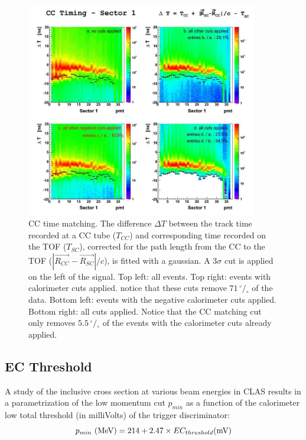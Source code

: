 \begin{figure}[h]
  \centering
		\includegraphics[width=0.90\textwidth]{img/cc_timing_sect1.jpg}
		\caption{CC time matching. The difference $\Delta T$ between the track time recorded
               at a CC tube ($T_{CC}$) and corresponding time recorded on the TOF ($T_{SC}$),
               corrected for the path length from the CC to the TOF ($|\vec{R_{CC}}-\vec{R_{SC}}|/c$),
               is fitted with a gaussian. A 3$\sigma$ cut is applied on the left of the signal.
               Top left: all events. Top right: events with calorimeter cuts applied.
               notice that these cuts remove $71 \,^{\circ\!\!}/\!_\circ$ of the data.
               Bottom left: events with the negative calorimeter cuts applied.
               Bottom right: all cuts applied. Notice that the CC matching cut
               only removes $5.5  \,^{\circ\!\!}/\!_\circ$ of the events with
               the calorimeter cuts already applied.}
 		\label{fig:cc_time_sec1}
\end{figure}


\clearpage\newpage


\clearpage\newpage
\subsection{EC Threshold}
A study \cite{bib:ecmin} of the inclusive cross section at various beam energies in CLAS 
results in a parametrization of the low momentum cut $p_{min}$ as a function of
the calorimeter low total threshold (in milliVolts) of the trigger discriminator:
\begin{equation}
 \label{eq:pmin} 
 p_{min}\,\,{\rm (MeV)} = 214 + 2.47\times EC_{threshold}{\rm (mV)}
\end{equation}

